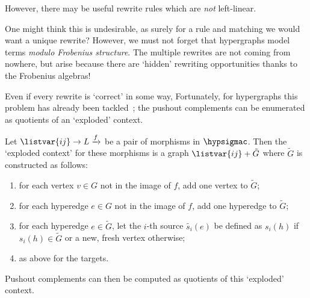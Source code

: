 However, there may be useful rewrite rules which are \emph{not} left-linear.

\begin{example}
\end{example}

One might think this is undesirable, as surely for a rule and matching we would
want a unique rewrite?
However, we must not forget that hypergraphs model terms
\emph{modulo Frobenius structure}.
The multiple rewrites are not coming from nowhere, but arise because there are
`hidden' rewriting opportunities thanks to the Frobenius algebras!

\begin{example}
\end{example}

Even if every rewrite is `correct' in some way,
Fortunately, for hypergraphs this problem has already been
tackled~\cite{heumuller2011construction}; the pushout complements can be
enumerated as quotients of an `exploded' context.

\begin{definition}
    Let \(\listvar{ij} \to L \xrightarrow{f}\) be a pair of morphisms in
    \(\hypsigmac\).
    Then the `exploded context' for these morphisms is a graph
    \(\listvar{ij} + \tilde{G}\) where \(\tilde{G}\) is constructed as follows:
    \begin{enumerate}
        \item for each vertex \(v \in G\) not in the image of \(f\), add one
              vertex to \(\tilde{G}\);
        \item for each hyperedge \(e \in G\) not in the image of \(f\), add one
              hyperedge to \(\tilde{G}\);
        \item for each hyperedge \(e \in \tilde{G}\), let the \(i\)-th source
              \(\tilde{s_i}(e)\) be defined as \(s_i(h)\) if
              \(s_i(h) \in \tilde{G}\) or a new, fresh vertex otherwise;
        \item as above for the targets.
    \end{enumerate}
\end{definition}

Pushout complements can then be computed as quotients of this `exploded'
context.

